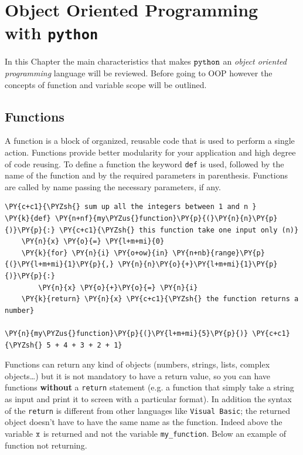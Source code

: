 \chapter{Object Oriented Programming with \texttt{python}}\label{introduction-to-python---lesson-2}

In this Chapter the main characteristics that makes $\tt{python}$ an \textit{object oriented programming} language will be reviewed.
Before going to OOP however the concepts of function and variable scope will be outlined.

\section{Functions}\label{functions}

A function is a block of organized, reusable code that is used to perform a single action. 
Functions provide better modularity for your application and high degree of code reusing.
To define a function the keyword \texttt{def} is used, followed by the name of the function 
and by the required parameters in parenthesis. 
Functions are called by name passing the necessary parameters, if any.

\begin{codebox}[breakable, size=fbox, boxrule=1pt, pad at break*=1mm,colback=cellbackground, colframe=cellborder]
\begin{Verbatim}[commandchars=\\\{\}]
\PY{c+c1}{\PYZsh{} sum up all the integers between 1 and n }
\PY{k}{def} \PY{n+nf}{my\PYZus{}function}\PY{p}{(}\PY{n}{n}\PY{p}{)}\PY{p}{:} \PY{c+c1}{\PYZsh{} this function take one input only (n)}
    \PY{n}{x} \PY{o}{=} \PY{l+m+mi}{0}
    \PY{k}{for} \PY{n}{i} \PY{o+ow}{in} \PY{n+nb}{range}\PY{p}{(}\PY{l+m+mi}{1}\PY{p}{,} \PY{n}{n}\PY{o}{+}\PY{l+m+mi}{1}\PY{p}{)}\PY{p}{:}
        \PY{n}{x} \PY{o}{+}\PY{o}{=} \PY{n}{i}
    \PY{k}{return} \PY{n}{x} \PY{c+c1}{\PYZsh{} the function returns a number}

\PY{n}{my\PYZus{}function}\PY{p}{(}\PY{l+m+mi}{5}\PY{p}{)} \PY{c+c1}{\PYZsh{} 5 + 4 + 3 + 2 + 1}
\end{Verbatim}
\end{codebox}

Functions can return any kind of objects (numbers, strings, lists, complex objects\ldots) 
but it is not mandatory to have a return value, so you can have functions \textbf{without} 
a \texttt{return} statement (e.g. a function that simply take a string as input and print it 
to screen with a particular format).
In addition the syntax of the \texttt{return} is different from other languages like 
\texttt{Visual\ Basic}; the returned object doesn't have to have the same name as the function. 
Indeed above the variable $\tt{x}$ is returned and not the variable \texttt{my\_function}. 
Below an example of function not returning.

